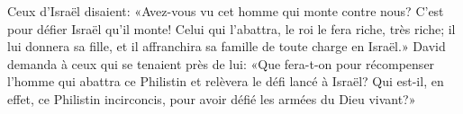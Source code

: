 Ceux d’Israël disaient:
	«Avez-vous vu cet homme qui monte contre nous?
	C’est pour défier Israël qu’il monte!
Celui qui l’abattra, le roi le fera riche, très riche;
	il lui donnera sa fille, et il affranchira sa famille de toute charge en Israël.»
David demanda à ceux qui se tenaient près de lui:
	«Que fera-t-on pour récompenser l’homme qui abattra ce Philistin
	et relèvera le défi lancé à Israël?
	Qui est-il, en effet, ce Philistin incirconcis,
	pour avoir défié les armées du Dieu vivant?»
